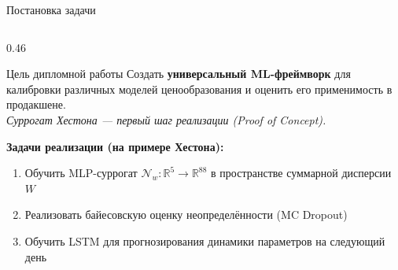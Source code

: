 \documentclass[aspectratio=169, 10pt]{beamer}
\begin{document}
\begin{frame}{Постановка задачи}
\begin{columns}[T]
    \begin{column}{0.46\textwidth}
      \begin{alertblock}{Цель дипломной работы}
        \scriptsize
        Создать \textbf{универсальный ML-фреймворк} для калибровки различных моделей
        ценообразования и оценить его применимость в продакшене.\\
        \vspace{0.3em}
        \textit{Суррогат Хестона — первый шаг реализации (Proof of Concept).}
      \end{alertblock}
      \vspace{0.4em}
      \textbf{Задачи реализации (на примере Хестона):}
      \begin{enumerate}\scriptsize
        \item[\textbf{Ф1}] Обучить MLP-суррогат
                           $\mathcal{N}_w : \mathbb{R}^5 \to \mathbb{R}^{88}$
                           в пространстве суммарной дисперсии $W$
        \item[\textbf{Ф2}] Реализовать байесовскую оценку неопределённости
                           (MC Dropout)
        \item[\textbf{Ф3}] Обучить LSTM для прогнозирования
                           динамики параметров на следующий день
      \end{enumerate}
      \vspace{0.4em}
      \begin{center}
      \end{center}
    \end{column}

  \end{columns}
\end{frame}
\end{document}
